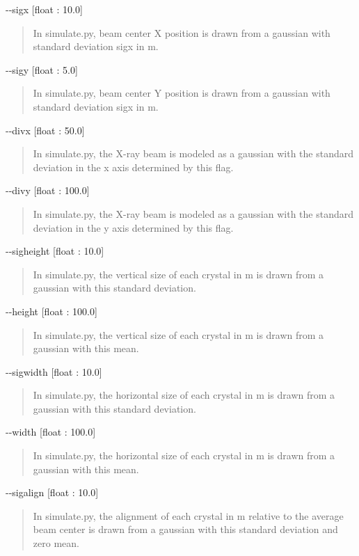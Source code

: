 \documentclass{report}
\begin{document}
\noindent
-{}-sigx [float : 10.0]
\begin{quote}
    In simulate.py, beam center X position is drawn from a gaussian with standard deviation sigx in \textmu m. 
\end{quote}

\noindent
-{}-sigy [float : 5.0]
\begin{quote}
    In simulate.py, beam center Y position is drawn from a gaussian with standard deviation sigx in \textmu m. 
\end{quote}


\noindent
-{}-divx [float : 50.0]
\begin{quote}
    In simulate.py, the X-ray beam is modeled as a gaussian with the standard deviation in the x axis determined by this flag.
\end{quote}

\noindent
-{}-divy [float : 100.0]
\begin{quote}
    In simulate.py, the X-ray beam is modeled as a gaussian with the standard deviation in the y axis determined by this flag.
\end{quote}

\noindent
-{}-sigheight [float : 10.0]
\begin{quote}
    In simulate.py, the vertical size of each crystal in \textmu m is drawn from a gaussian with this standard deviation.
\end{quote}

\noindent
-{}-height [float : 100.0]
\begin{quote}
    In simulate.py, the vertical size of each crystal in \textmu m is drawn from a gaussian with this mean. 
\end{quote}

\noindent
-{}-sigwidth [float : 10.0]
\begin{quote}
    In simulate.py, the horizontal size of each crystal in \textmu m is drawn from a gaussian with this standard deviation.
\end{quote}

\noindent
-{}-width [float : 100.0]
\begin{quote}
    In simulate.py, the horizontal size of each crystal in \textmu m is drawn from a gaussian with this mean. 
\end{quote}

\noindent
-{}-sigalign [float : 10.0]
\begin{quote}
    In simulate.py, the alignment of each crystal in \textmu m relative to the average beam center is drawn from a gaussian with this standard deviation and zero mean.
\end{quote}
\end{document}
